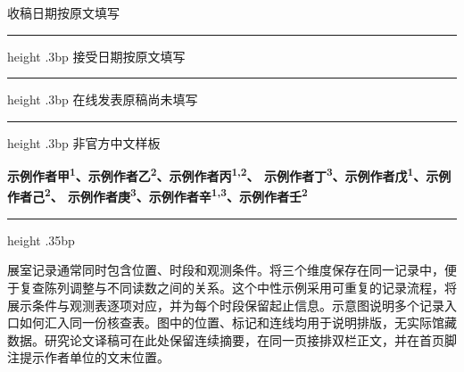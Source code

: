 \noindent\begin{minipage}[t]{.317\textwidth}
  \vspace{0pt}\sffamily\fontsize{8bp}{11.3bp}\selectfont
  收稿日期\enspace 按原文填写\par\vspace{4bp}\hrule height .3bp\vspace{4bp}
  接受日期\enspace 按原文填写\par\vspace{4bp}\hrule height .3bp\vspace{4bp}
  在线发表\enspace 原稿尚未填写\par\vspace{4bp}\hrule height .3bp\vspace{4bp}
  非官方中文样板
\end{minipage}\hfill
\begin{minipage}[t]{.655\textwidth}
  \vspace{0pt}\setlength{\parindent}{0pt}
  {\sffamily\bfseries\fontsize{9bp}{12.1bp}\selectfont
  示例作者甲\textsuperscript{1}、示例作者乙\textsuperscript{2}、示例作者丙\textsuperscript{1,2}、
  示例作者丁\textsuperscript{3}、示例作者戊\textsuperscript{1}、示例作者己\textsuperscript{2}、
  示例作者庚\textsuperscript{3}、示例作者辛\textsuperscript{1,3}、示例作者壬\textsuperscript{2}\par}
  \vspace{6bp}\hrule height .35bp\vspace{7bp}
  {\fontsize{11bp}{15.2bp}\selectfont
  展室记录通常同时包含位置、时段和观测条件。将三个维度保存在同一记录中，便于复查陈列调整与不同读数之间的关系。这个中性示例采用可重复的记录流程，将展示条件与观测表逐项对应，并为每个时段保留起止信息。示意图说明多个记录入口如何汇入同一份核查表。图中的位置、标记和连线均用于说明排版，无实际馆藏数据。研究论文译稿可在此处保留连续摘要，在同一页接排双栏正文，并在首页脚注提示作者单位的文末位置。\par}
\end{minipage}
\par\vspace{10bp}

